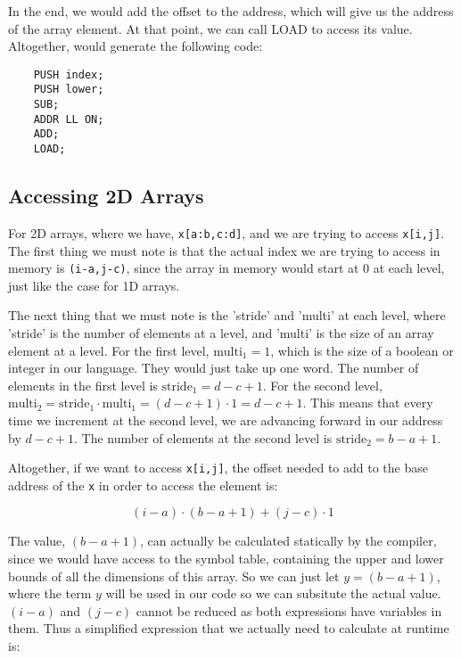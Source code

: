 \documentclass{article}
\begin{document}
In the end, we would add the offset to the address, which will give us the address of the array element. At that point, we can call LOAD to access its value. Altogether, would generate the following code:

\begin{lstlisting}
    PUSH index;
    PUSH lower;
    SUB;
    ADDR LL ON;
    ADD;
    LOAD;
\end{lstlisting}

\subsection{Accessing 2D Arrays}

For 2D arrays, where we have, \texttt{x[a:b,c:d]}, and we are trying to access \texttt{x[i,j]}. The first thing we must note is that the actual index we are trying to access in memory is \texttt{(i-a,j-c)}, since the array in memory would start at 0 at each level, just like the case for 1D arrays.

The next thing that we must note is the 'stride' and 'multi' at each level, where 'stride' is the number of elements at a level, and 'multi' is the size of an array element at a level. For the first level, $\text{multi}_1 = 1$, which is the size of a boolean or integer in our language. They would just take up one word. The number of elements in the first level is $\text{stride}_1 = d - c + 1$. For the second level, $\text{multi}_2 = \text{stride}_1 \cdot \text{multi}_1 = (d - c + 1) \cdot 1 = d - c + 1$. This means that every time we increment at the second level, we are advancing forward in our address by $d - c + 1$. The number of elements at the second level is $\text{stride}_2 = b - a + 1$.

Altogether, if we want to access \texttt{x[i,j]}, the offset needed to add to the base address of the \texttt{x} in order to access the element is:

$$(i - a) \cdot (b - a + 1) + (j - c) \cdot 1$$

The value, $(b - a + 1)$, can actually be calculated statically by the compiler, since we would have access to the symbol table, containing the upper and lower bounds of all the dimensions of this array. So we can just let $y = (b - a + 1)$, where the term $y$ will be used in our code so we can subsitute the actual value. $(i - a)$ and $(j - c)$ cannot be reduced as both expressions have variables in them. Thus a simplified expression that we actually need to calculate at runtime is:
\end{document}
